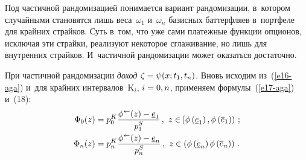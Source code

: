 \begin{multicols}{2}
  Под частичной рандомизацией понимается вариант рандомизации, в~котором 
случайными становятся лишь веса~$\omega_1$ и~$\omega_n$ базисных 
баттерфляев в~портфеле для крайних страйков. Суть в~том, что уже сами 
платежные функции опционов, исключая эти страйки, реализуют некоторое 
сглаживание, но лишь для внутренних страйков. И~частичной рандомизации 
может оказаться достаточно. 
  
  При частичной рандомизации \textit{доход} $\zeta\hm=\psi(x; t_1, t_n)$. Вновь 
исходим из~(\ref{e16-aga}) и~для крайних интервалов~$\mathrm{K}_i$, $i\hm = 
0, n$, применяем формулы~(\ref{e17-aga}) и~(18): 
  \begin{align*}
  \Phi_0(z) &= p_0^K 
  \displaystyle\frac{\displaystyle \phi^{\leftarrow} (z) -\underline{e}_1\mathstrut}{\displaystyle p_1^S\mathstrut}\,,\ z\in \left[ \phi\left( 
\underline{e}_1\right), \phi\left( \overline{e}_1\right)\right)\,;\\
  \Phi_n(z) &=p_n^K \displaystyle\frac{\displaystyle \phi^\leftarrow (z) -\underline{e}_n\mathstrut}{\displaystyle p_n^S\mathstrut}\,,\ z\in \left( 
\phi\left( \underline{e}_n\right) \phi\left( \overline{e}_n\right)\right)\,.
  \end{align*}
  

\end{multicols}
